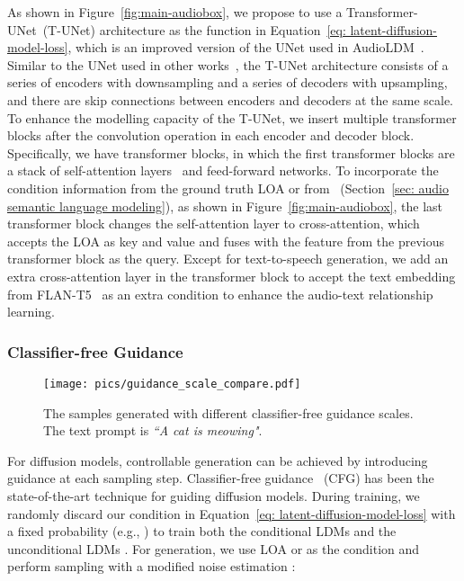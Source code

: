 \documentclass[lettersize,journal]{IEEEtran}
\begin{document}
As shown in Figure~\ref{fig:main-audiobox}, we propose to use a Transformer-UNet~(T-UNet) architecture as the function  in Equation~\eqref{eq: latent-diffusion-model-loss}, which is an improved version of the UNet used in AudioLDM~\cite{liu2023audioldm}. Similar to the UNet used in other works~\cite{kong2021decoupling}, the T-UNet architecture consists of a series of encoders with downsampling and a series of decoders with upsampling, and there are skip connections between encoders and decoders at the same scale. To enhance the modelling capacity of the T-UNet, we insert multiple transformer blocks after the convolution operation in each encoder and decoder block. Specifically, we have  transformer blocks, in which the first  transformer blocks are a stack of self-attention layers~\cite{vaswani2017attention-is-all-you-need} and feed-forward networks. To incorporate the condition information  from the ground truth LOA or  from ~(Section~\ref{sec: audio semantic language modeling}), as shown in Figure~\ref{fig:main-audiobox}, the last transformer block changes the self-attention layer to cross-attention, which accepts the LOA as key and value and fuses with the feature from the previous transformer block as the query. Except for text-to-speech generation, we add an extra cross-attention layer in the transformer block to accept the text embedding from FLAN-T5~\cite{chung2022scaling-flan-t5} as an extra condition to enhance the audio-text relationship learning. 



\subsubsection{Classifier-free Guidance}
\label{CFG}

\begin{figure}[htbp]
    \centering
    \texttt{[image: pics/guidance\_scale\_compare.pdf]}
    \caption{The samples generated with different classifier-free guidance scales. The text prompt is \textit{``A cat is meowing"}.}
    \label{fig:my_label}
\end{figure}

For diffusion models, controllable generation can be achieved by introducing guidance at each sampling step. Classifier-free guidance~\cite{CFG,Glide} (CFG) has been the state-of-the-art technique for guiding diffusion models.
During training, we randomly discard our condition  in Equation~\eqref{eq: latent-diffusion-model-loss} with a fixed probability (e.g., ) to train both the conditional LDMs  and the unconditional LDMs . For generation, we use LOA  or  as the condition and perform sampling with a modified noise estimation :
\end{document}
